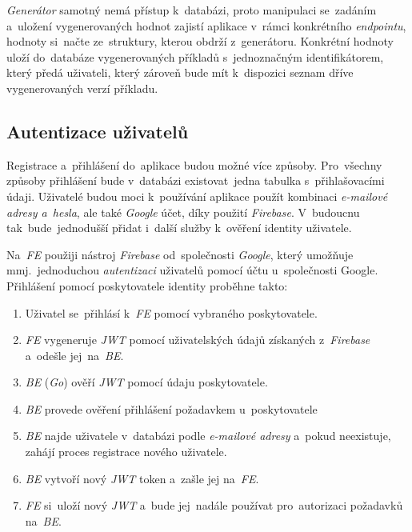 \documentclass[11pt,a4paper]{report}
\let\oldacrshort\acrshort
\renewcommand{\acrshort}[1]{\emph{\normalsize\color[rgb]{0,0,0}\noindent\oldacrshort{#1}}}
\begin{document}
            \emph{Generátor} samotný nemá přístup k~databázi, proto manipulaci se~zadáním a~uložení vygenerovaných hodnot zajistí aplikace v~rámci konkrétního \emph{endpointu}, hodnoty si~načte ze~struktury, kterou obdrží z~generátoru. Konkrétní hodnoty uloží do~databáze vygenerovaných příkladů s~jednoznačným identifikátorem, který předá uživateli, který zároveň bude mít k~dispozici seznam dříve vygenerovaných verzí příkladu.

        \subsection{Autentizace uživatelů}
            Registrace a~přihlášení do~aplikace budou možné více způsoby. Pro~všechny způsoby přihlášení bude v~databázi existovat~jedna tabulka s~přihlašovacími údaji. Uživatelé budou moci k~používání aplikace použít kombinaci \emph{e-mailové adresy a~hesla}, ale také \emph{Google} účet, díky použití \emph{Firebase}. V~budoucnu tak~bude~jednodušší přidat i~další služby k~ověření identity uživatele.
            
            Na~\acrshort{FE} použiji nástroj \emph{Firebase} od~společnosti \emph{Google}, který umožňuje mmj.~jednoduchou \emph{autentizaci} uživatelů pomocí účtu u~společnosti Google. Přihlášení pomocí poskytovatele identity proběhne takto:
            \begin{enumerate}
                \item Uživatel se~přihlásí k~\acrshort{FE} pomocí vybraného poskytovatele.
                \item \acrshort{FE} vygeneruje \acrshort{JWT} pomocí uživatelských údajů získaných z~\emph{Firebase} a~odešle jej~na~\acrshort{BE}.
                \item \acrshort{BE} (\emph{Go}) ověří \acrshort{JWT} pomocí údaju poskytovatele.
                \item \acrshort{BE} provede ověření přihlášení požadavkem u~poskytovatele
                \item \acrshort{BE} najde uživatele v~databázi podle \emph{e-mailové adresy} a~pokud neexistuje, zahájí proces registrace nového uživatele.
                \item \acrshort{BE} vytvoří nový \acrshort{JWT} token a~zašle jej na~\acrshort{FE}.
                \item \acrshort{FE} si~uloží nový \acrshort{JWT} a~bude jej~nadále používat pro~autorizaci požadavků na~\acrshort{BE}.
            \end{enumerate}
            
\end{document}
